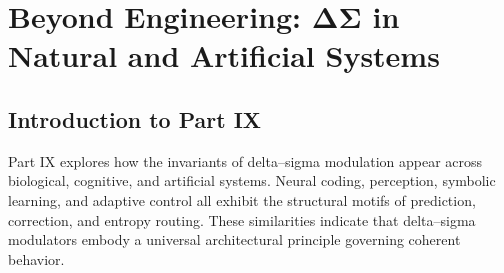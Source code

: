 \documentclass[12pt,oneside]{book}
\theoremstyle{definition}
\theoremstyle{plain}
\begin{document}







\part{Beyond Engineering: ΔΣ in Natural and Artificial Systems}

\chapter*{Introduction to Part IX}

Part IX explores how the invariants of delta--sigma modulation appear across biological, cognitive, and artificial systems. Neural coding, perception, symbolic learning, and adaptive control all exhibit the structural motifs of prediction, correction, and entropy routing. These similarities indicate that delta--sigma modulators embody a universal architectural principle governing coherent behavior.











\appendix








\backmatter
\printbibliography
\end{document}
